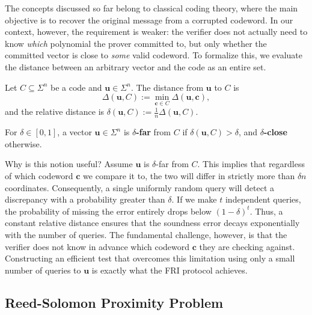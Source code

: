 \documentclass[../../book]{subfiles}
\begin{document}
The concepts discussed so far belong to classical coding theory, where the main objective is to recover the original message from a corrupted codeword. In our context, however, the requirement is weaker: the verifier does not actually need to know \emph{which} polynomial the prover committed to, but only whether the committed vector is close to \emph{some} valid codeword. To formalize this, we evaluate the distance between an arbitrary vector and the code as an entire set.

\begin{definition}\label{def:dist-to-code}
    Let $C \subseteq \Sigma^n$ be a code and $\mathbf{u} \in \Sigma^n$. The distance from
    $\mathbf{u}$ to $C$ is
    \begin{equation*}
        \Delta(\mathbf{u}, C) := \min_{\mathbf{c} \in C} \Delta(\mathbf{u}, \mathbf{c}),
    \end{equation*}
    and the relative distance is $\delta(\mathbf{u}, C) := \frac{1}{n}\Delta(\mathbf{u}, C)$.
\end{definition}

\begin{definition}\label{def:delta-far}
    For $\delta \in [0,1]$, a vector $\mathbf{u} \in \Sigma^n$ is \textbf{$\delta$-far} from $C$
    if $\delta(\mathbf{u}, C) > \delta$, and \textbf{$\delta$-close} otherwise.
\end{definition}

Why is this notion useful? Assume $\mathbf{u}$ is $\delta$-far from $C$. This implies that regardless of which codeword $\mathbf{c}$ we compare it to, the two will differ in strictly more than $\delta n$ coordinates. Consequently, a single uniformly random query will detect a discrepancy with a probability greater than $\delta$. If we make $t$ independent queries, the probability of missing the error entirely drops below $(1-\delta)^t$. Thus, a constant relative distance ensures that the soundness error decays exponentially with the number of queries. The fundamental challenge, however, is that the verifier does not know in advance which codeword $\mathbf{c}$ they are checking against. Constructing an efficient test that overcomes this limitation using only a small number of queries to $\mathbf{u}$ is exactly what the FRI protocol achieves.

\subsection{Reed-Solomon Proximity Problem}\label{subsec:rs-proximity}
\end{document}
